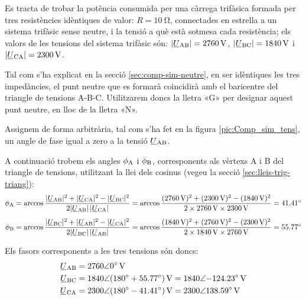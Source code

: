 \begin{exemple}\label{ex:ImpedEquil}
	\addcontentsxms{\ImpedEquil}
    Es tracta de trobar la potència consumida per una càrrega trifàsica
    formada per tres resistències idèntiques de valor: $R=\qty{10}{\ohm}$,
    connectades en estrella a un sistema trifàsic sense neutre, i la
    tensió a què està sotmesa cada resistència; els valors de les
    tensions del sistema trifàsic són: $|\cmplx{U}\ped{AB}| =
    \qty{2760}{V}$, $|\cmplx{U}\ped{BC}| = \qty{1840}{V}$ i
    $|\cmplx{U}\ped{CA}| = \qty{2300}{V}$.

    Tal com s'ha explicat en la secció \vref{sec:comp-sim-neutre}, en ser idèntiques les tres impedàncies, el punt neutre que es formarà coincidirà amb el baricentre del triangle de tensions A-B-C. Utilitzarem doncs la lletra «G» per designar aquest punt neutre, en lloc de la lletra «N».

    Assignem de forma arbitrària, tal com s'ha fet en la figura
    \vref{pic:Comp_sim_tens}, un angle de fase igual a zero a la tensió
    $\cmplx{U}\ped{AB}$.

    \begin{center}
        
    \end{center}

    A continuació trobem els angles $\phi_\mathrm{A}$ i $\phi_\mathrm{B}$,
    corresponents als vèrtexs  A i B del triangle de
    tensions, utilitzant la llei dels cosinus (vegeu la secció
    \vref{sec:lleis-trig-triang}): 
    \begin{align*}
        \phi\ped{A} &= \arccos \frac{|\cmplx{U}\ped{AB}|^2 + |\cmplx{U}\ped{CA}|^2 -
        |\cmplx{U}\ped{BC}|^2}{2 |\cmplx{U}\ped{AB}| \,|\cmplx{U}\ped{CA}|} =
        \arccos \frac{(\qty{2760}{V})^2 + (\qty{2300}{V})^2 - (\qty{1840}{V})^2}{2 \times \qty{2760}{V}
        \times \qty{2300}{V}} = \ang{41,41} \\[1ex]
        \phi\ped{B} &= \arccos \frac{|\cmplx{U}\ped{BC}|^2 + |\cmplx{U}\ped{AB}|^2 -
        |\cmplx{U}\ped{CA}|^2}{2 |\cmplx{U}\ped{BC}| \,|\cmplx{U}\ped{AB}|} =
        \arccos \frac{(\qty{1840}{V})^2 + (\qty{2760}{V})^2 - (\qty{2300}{V})^2}{2 \times \qty{1840}{V}
        \times \qty{2760}{V}} = \ang{55,77}
    \end{align*}

    Els fasors corresponents a les tres tensions són doncs:
    \begin{align*}
    \cmplx{U}\ped{AB} &= \complexqty{2760:0}{V} \\
    \cmplx{U}\ped{BC} &= \num{1840}\angle(\ang{180} + \ang{55,77})\unit{\,V} =
    \complexqty{1840:-124,23}{V} \\
    \cmplx{U}\ped{CA} &= \num{2300}\angle(\ang{180} - \ang{41,41})\unit{\,V} = \complexqty{2300:138,59}{V} 
    \end{align*}


\end{exemple}
